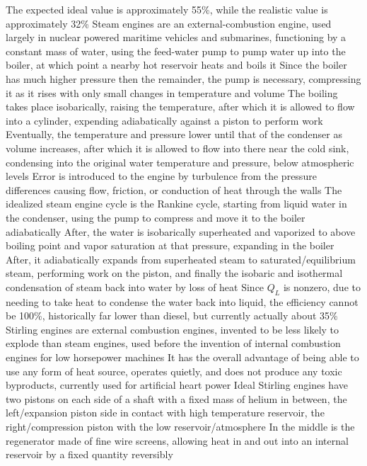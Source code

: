 \documentclass[11 pt, twoside]{article}
\newenvironment{outline*}
{
	\begin{outline}[enumerate]
	}
	{\end{outline}
}
\begin{document}
\begin{outline*}
\3 The expected ideal value is approximately 55\%, while the realistic value is approximately 32\%
\1 Steam engines are an external-combustion engine, used largely in nuclear powered maritime vehicles and submarines, functioning by a constant mass of water, using the feed-water pump to pump water up into the boiler, at which point a nearby hot reservoir heats and boils it
\2 Since the boiler has much higher pressure then the remainder, the pump is necessary, compressing it as it rises with only small changes in temperature and volume
\3 The boiling takes place isobarically, raising the temperature, after which it is allowed to flow into a cylinder, expending adiabatically against a piston to perform work
\3 Eventually, the temperature and pressure lower until that of the condenser as volume increases, after which it is allowed to flow into there near the cold sink, condensing into the original water temperature and pressure, below atmospheric levels
\2 Error is introduced to the engine by turbulence from the pressure differences causing flow, friction, or conduction of heat through the walls
\2 The idealized steam engine cycle is the Rankine cycle, starting from liquid water in the condenser, using the pump to compress and move it to the boiler adiabatically
\3 After, the water is isobarically superheated and vaporized to above boiling point and vapor saturation at that pressure, expanding in the boiler
\3 After, it adiabatically expands from superheated steam to saturated/equilibrium steam, performing work on the piston, and finally the isobaric and isothermal condensation of steam back into water by loss of heat
\2 Since $Q_L$ is nonzero, due to needing to take heat to condense the water back into liquid, the efficiency cannot be 100\%, historically far lower than diesel, but currently actually about 35\%
\1 Stirling engines are external combustion engines, invented to be less likely to explode than steam engines, used before the invention of internal combustion engines for low horsepower machines
\2 It has the overall advantage of being able to use any form of heat source, operates quietly, and does not produce any toxic byproducts, currently used for artificial heart power
\2 Ideal Stirling engines have two pistons on each side of a shaft with a fixed mass of helium in between, the left/expansion piston side in contact with high temperature reservoir, the right/compression piston with the low reservoir/atmosphere
\3 In the middle is the regenerator made of fine wire screens, allowing heat in and out into an internal reservoir by a fixed quantity reversibly

\end{outline*}
\end{document}
